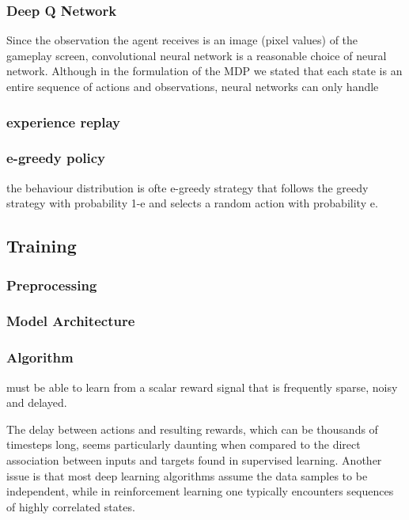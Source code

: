 \documentclass{article}
\begin{document}
\begin{multicols}{2}
\subsubsection{Deep Q Network}

Since the observation the agent receives is an image (pixel values) of the gameplay screen, convolutional neural network is a reasonable choice of neural network. Although in the formulation of the MDP we stated that each state is an entire sequence of actions and observations, neural networks can only handle

\subsubsection{experience replay}

\subsubsection{e-greedy policy}

the behaviour distribution is ofte e-greedy strategy that follows the greedy strategy with probability 1-e and selects a random action with probability e.


\subsection{Training}

\subsubsection{Preprocessing}

\subsubsection{Model Architecture}

\subsubsection{Algorithm}

must be able to learn from a scalar reward signal that is frequently sparse, noisy and delayed.

The delay between actions and resulting rewards, which can be thousands of timesteps long, seems particularly daunting when compared to the direct association between inputs and targets found in supervised learning. Another issue is that most deep learning algorithms assume the data samples to be independent, while in reinforcement learning one typically encounters sequences of highly correlated states.



\end{multicols}
\end{document}
